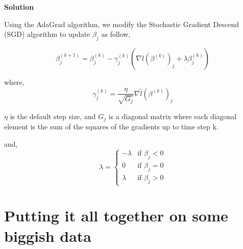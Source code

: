 \documentclass[11 pt]{article}
\begin{document}
\newpage
\textbf{Solution}

Using the AdaGrad algorithm, we modify the Stochastic Gradient Descend (SGD) algorithm to update $\beta_j$ as follow,

$$\beta^{(k+1)}_j = \beta^{(k)}_j - \gamma_j^{(k)} \left ( \nabla l(\beta^{(k)})_j + \lambda \beta^{(k)}_j \right)$$

where, 
$$\gamma_j^{(k)} = \frac{\eta}{\sqrt{G_j}} \nabla \tilde{l}(\beta^{(k)})_j$$

 $\eta$ is the default step size, and
 $G_j$ is a diagonal matrix where each diagonal element is the sum of the squares of the gradients up to time step k. 
  
and,
\[ \lambda = \left\{ \begin{array}{lll}
- \lambda & \mbox{if $\beta_j < 0$}\\
0 & \mbox{if $\beta_j = 0$}\\
\lambda & \mbox{if $\beta_j > 0$}
\end{array} \right. \]

\newpage
\section{Putting it all together on some biggish data}
\end{document}
